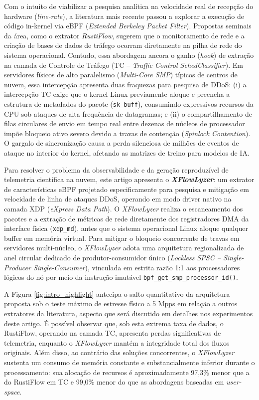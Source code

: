\documentclass[conference]{IEEEtran}
\newcommand{\nome}{\textit{XFlowLyzer}\xspace}
\begin{document}
Com o intuito de viabilizar a pesquisa analítica na velocidade real de recepção do hardware (\textit{line-rate}), a literatura mais recente passou a explorar a execução de código in-kernel via eBPF (\textit{Extended Berkeley Packet Filter}). Propostas seminais da área, como o extrator \textit{RustiFlow}, sugerem que o monitoramento de rede e a criação de bases de dados de tráfego ocorram diretamente na pilha de rede do sistema operacional. Contudo, essa abordagem ancora o ganho (\textit{hook}) de extração na camada de Controle de Tráfego (TC -- \textit{Traffic Control SchedClassifier}). Em servidores físicos de alto paralelismo (\textit{Multi-Core SMP}) típicos de centros de nuvem, essa intercepção apresenta duas fraquezas para pesquisa de DDoS: (i) a intercepção TC exige que o kernel Linux previamente aloque e preencha a estrutura de metadados do pacote (\texttt{sk\_buff}), consumindo expressivos recursos da CPU sob ataques de alta frequência de datagramas; e (ii) o compartilhamento de filas circulares de envio em tempo real entre dezenas de núcleos de processador impõe bloqueio ativo severo devido a travas de contenção (\textit{Spinlock Contention}). O gargalo de sincronização causa a perda silenciosa de milhões de eventos de ataque no interior do kernel, afetando as matrizes de treino para modelos de IA.

Para resolver o problema da observabilidade e da geração reproduzível de telemetria científica na nuvem, este artigo apresenta o \textbf{\nome}: um extrator de características eBPF projetado especificamente para pesquisa e mitigação em velocidade de linha de ataques DDoS, operando em modo driver nativo na camada XDP (\textit{eXpress Data Path}). O \nome realiza o escaneamento dos pacotes e a extração de métricas de rede diretamente dos registradores DMA da interface física (\texttt{xdp\_md}), antes que o sistema operacional Linux aloque qualquer buffer em memória virtual. Para mitigar o bloqueio concorrente de travas em servidores multi-núcleo, o \nome adota uma arquitetura regionalizada de anel circular dedicado de produtor-consumidor único (\textit{Lockless SPSC -- Single-Producer Single-Consumer}), vinculada em estrita razão 1:1 aos processadores lógicos do nó por meio da instrução imutável \texttt{bpf\_get\_smp\_processor\_id()}.

A Figura \ref{fig:intro_highlight} antecipa o salto quantitativo da arquitetura proposta sob o teste máximo de estresse físico a 5 Mpps em relação a outros extratores da literatura, aspecto que será discutido em detalhes nos experimentos deste artigo. É possível observar que, sob esta extrema taxa de dados, o RustiFlow, operando na camada TC, apresenta perdas significativas de telemetria, enquanto o \nome mantém a integridade total dos fluxos originais. Além disso, ao contrário das soluções concorrentes, o \nome sustenta um consumo de memória constante e substancialmente inferior durante o processamento: sua alocação de recursos é aproximadamente 97,3\% menor que a do RustiFlow em TC e 99,0\% menor do que as abordagens baseadas em \textit{user-space}.
\end{document}
